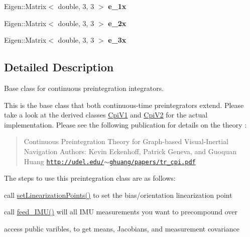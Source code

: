\begin{DoxyCompactItemize}
\item 
\mbox{\label{classov__core_1_1CpiBase_a37d297cce43fb6cec20a2ee3ee8a7d51}} 
Eigen\+::\+Matrix$<$ double, 3, 3 $>$ {\bfseries e\+\_\+1x}
\item 
\mbox{\label{classov__core_1_1CpiBase_adf133215dc6e35fdeec0c6d448aafc94}} 
Eigen\+::\+Matrix$<$ double, 3, 3 $>$ {\bfseries e\+\_\+2x}
\item 
\mbox{\label{classov__core_1_1CpiBase_a6f34ad2753e4e7b1abc0ef7f4bdca2b5}} 
Eigen\+::\+Matrix$<$ double, 3, 3 $>$ {\bfseries e\+\_\+3x}
\end{DoxyCompactItemize}


\subsection{Detailed Description}
Base class for continuous preintegration integrators. 

This is the base class that both continuous-\/time preintegrators extend. Please take a look at the derived classes \hyperlink{classov__core_1_1CpiV1}{Cpi\+V1} and \hyperlink{classov__core_1_1CpiV2}{Cpi\+V2} for the actual implementation. Please see the following publication for details on the theory \cite{Eckenhoff2019IJRR} \+: \begin{quote}
Continuous Preintegration Theory for Graph-\/based Visual-\/\+Inertial Navigation Authors\+: Kevin Eckenhoff, Patrick Geneva, and Guoquan Huang \href{http://udel.edu/~ghuang/papers/tr_cpi.pdf}{\tt http\+://udel.\+edu/$\sim$ghuang/papers/tr\+\_\+cpi.\+pdf} \end{quote}


The steps to use this preintegration class are as follows\+:
\begin{DoxyEnumerate}
\item call \hyperlink{classov__core_1_1CpiBase_a32c11e3e61dc8a524bf48a18504b5417}{set\+Linearization\+Points()} to set the bias/orientation linearization point
\item call \hyperlink{classov__core_1_1CpiBase_af3b192b968d702b484a672a5557bea13}{feed\+\_\+\+I\+M\+U()} will all I\+MU measurements you want to precompound over
\item access public varibles, to get means, Jacobians, and measurement covariance 
\end{DoxyEnumerate}


